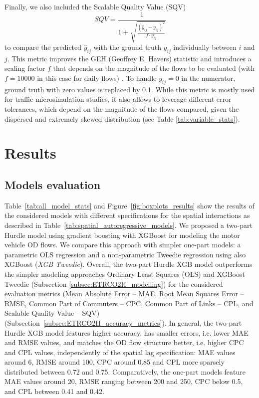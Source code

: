 Finally, we also included the Scalable Quality Value (SQV) 
\begin{equation}
\label{eq:SQV}
SQV = \frac{1}{1 + \sqrt{\frac{{(\hat{y}_{ij} - y_{ij})^2}}{{f \cdot y_{ij}}}}}
\end{equation}
to compare the predicted $\hat{y}_{ij}$ with the ground truth $y_{ij}$ individually between $i$ and $j$. This metric improves the GEH (Geoffrey E. Havers) statistic \citep{Dowling2004TrafficSoftware} and introduces a scaling factor $f$ that depends on the magnitude of the flows to be evaluated (with $f=10000$ in this case for daily flows) \citep{Friedrich2019ScalableValidation}. To handle $y_{ij}=0$ in the numerator, ground truth with zero values is replaced by 0.1. While this metric is mostly used for traffic microsimulation studies, it also allows to leverage different error tolerances, which depend on the magnitude of the flows compared, given the dispersed and extremely skewed distribution (see Table \ref{tab:variable_stats}).

\section{Results}
\label{sec:ETRCO2H_results}
\subsection{Models evaluation}

Table~\ref{tab:all_model_stats} and Figure~\ref{fig:boxplots_results} show the results of the considered models with different specifications for the spatial interactions as described in Table~\ref{tab:spatial_autoregressive_models}. We proposed a two-part Hurdle model \citep{Mullahy1986SpecificationModels} using gradient boosting \citep{Friedman2001GreedyMachine.} with XGBoost \citep{Chen2016XGBoost:System} for modeling the motor vehicle OD flows. We compare this approach with simpler one-part models: a parametric OLS regression and a non-parametric Tweedie regression using also XGBoost (\textit{XGB Tweedie}).
Overall, the two-part Hurdle XGB model outperforms the simpler modeling approaches Ordinary Least Squares (OLS) and XGBoost Tweedie \citep{Chen2016XGBoost:System,Krasniqi2022ParametricFrequency} (Subsection \ref{subsec:ETRCO2H_modelling}) for the considered evaluation metrics (Mean Absolute Error -- MAE, Root Mean Squares Error -- RMSE, Common Part of Commuters -- CPC, Common Part of Links -- CPL, and Scalable Quality Value -- SQV) (Subsection~\ref{subsec:ETRCO2H_accuracy_metrics}). In general, the two-part Hurdle XGB model features higher accuracy, has smaller errors, i.e. lower MAE and RMSE values, and matches the OD flow structure better, i.e. higher CPC and CPL values, independently of the spatial lag specification: MAE values around 6, RMSE around 100, CPC around 0.85 and CPL more sparsely distributed between 0.72 and 0.75. Comparatively, the one-part models feature MAE values around 20, RMSE ranging between 200 and 250, CPC below 0.5, and CPL between 0.41 and 0.42.

